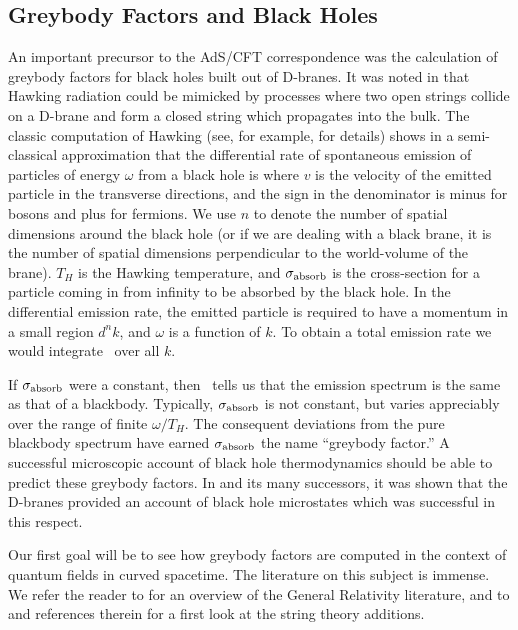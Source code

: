 \subsection{Greybody Factors and Black Holes} 
\label{gbFactorsBH}

An important precursor to the AdS/CFT correspondence was the calculation of
greybody factors for black holes built out of D-branes.  It was noted in
\cite{Callan:1996dv} that Hawking radiation could be mimicked by processes
where two open strings collide on a D-brane and form a closed string which
propagates into the bulk.  The classic computation of Hawking (see, for
example, \cite{Hawking:1974df} for details) shows in a semi-classical
approximation that the differential rate of spontaneous emission of
particles of energy $\omega$ from a black hole is
where $v$ is the velocity of the emitted particle in the 
transverse directions, and
 the sign in the denominator is minus for bosons and plus for
fermions.  We use $n$ to denote the number of spatial dimensions around the
black hole (or if we are dealing with a black brane, it is the number of
spatial dimensions perpendicular to the world-volume of the brane).  $T_H$
is the Hawking temperature, and $\sigma_{\rm absorb}$ is the cross-section
for a particle coming in from infinity to be absorbed by the black hole.
In the differential emission rate, the emitted particle is required to have
a momentum in a small region $d^n k$, and $\omega$ is a function of
$k$. To obtain a total emission rate we
would integrate \HawkingRadiation\ over all $k$.

If $\sigma_{\rm absorb}$ were a constant, then \HawkingRadiation\ tells us
that the emission spectrum is the same as that of a blackbody.  Typically,
$\sigma_{\rm absorb}$ is not constant, but varies appreciably over the
range of finite $\omega/T_H$.  The consequent deviations from the pure
blackbody spectrum have earned $\sigma_{\rm absorb}$ the name ``greybody
factor.''  A successful microscopic account of black hole thermodynamics
should be able to predict these greybody factors.  In \cite{Das:1996wn} and
its many successors, it was shown that the D-branes provided an account of
black hole microstates which was successful in this respect.

Our first goal will be to see how greybody factors are computed in the
context of quantum fields in curved spacetime.  The literature on this
subject is immense.  We refer the reader to \cite{Matzner} for an overview
of the General Relativity literature, and to
\cite{Maldacena:1997ix,Gubser:1997yh,Peet:1997es} and references therein
for a first look at the string theory additions.

